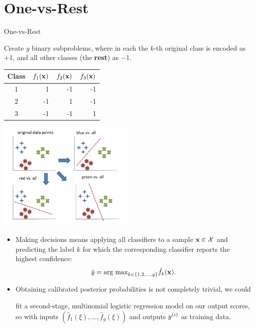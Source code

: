 \documentclass[11pt,compress,t,notes=noshow, xcolor=table]{beamer}
\begin{document}
\section{One-vs-Rest}

\begin{vbframe}{One-vs-Rest }


Create $g$ binary subproblems, where in each the $k$-th original class is encoded as $+1$, and all other classes (the \textbf{rest}) as $- 1$.


\begin{table}[]
  \footnotesize
  \begin{tabular}{|c|r|r|r|} \hline
  \textbf{Class}  & \textbf{$f_1{(\mathbf{x})}$} & \textbf{$f_2{(\mathbf{x})}$}  & \textbf{$f_3{(\mathbf{x})}$} \\ \hline
  \textbf{$1$}  &   1                 &  -1                   &  -1                   \\ \hline
  \textbf{$2$}  &  -1                 &  1                   & -1                   \\ \hline
  \textbf{$3$}  &  -1                 & -1                   &  1                   \\ \hline
  \end{tabular}
  \end{table}


    \begin{center}
    \includegraphics[width=0.5\textwidth]{figure_man/one_vs_all.png}
    \end{center}

  \begin{itemize}
    \item Making decisions means applying all classifiers to a sample $\mathbf{x} \in \mathcal{X}$ and predicting the label $k$ for which the corresponding classifier reports the highest confidence: 
    $$
      \hat y = \text{arg max}_{k \in \{1, 2, ..., g\}} \hat f_k(\mathbf{x}). 
    $$

    \item Obtaining calibrated posterior probabilities is not completely trivial, we could

    fit a second-stage, multinomial logistic regression model on our output scores, so with inputs $\left(\hat f_1(\xi), ..., \hat f_g(\xi)\right)$ and outputs $y^{(i)}$ as training data. 

  \end{itemize}
  \vspace*{0.2cm}


\end{vbframe}
\end{document}
